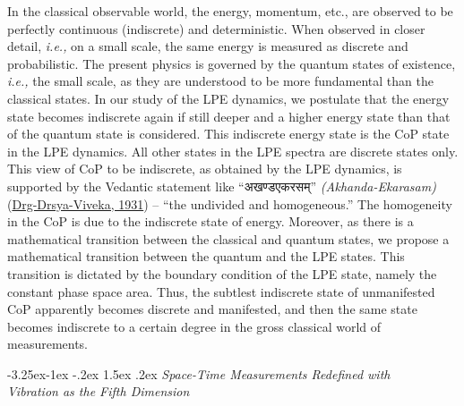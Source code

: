 \documentclass[twoside, 13pt]{article}
\makeatletter
\renewcommand\subsection{\@startsection{subsection}{2}{\z@}%
                                     {-3.25ex\@plus -1ex \@minus -.2ex}%
                                     {1.5ex \@plus .2ex}%
                                     {\normalfont\Large\bfseries}}
\makeatother
\begin{document}
{{\fontsize{12}{14}\selectfont In the classical observable world, the energy, momentum, etc., are observed to be perfectly continuous (indiscrete) and deterministic. When observed in closer detail, {\it i.e.,} on a small scale, the same energy is measured as discrete and probabilistic. The present physics is governed by the quantum states of existence, {\it i.e.,} the small scale, as they are understood to be more fundamental than the classical states. In our study of the LPE dynamics, we postulate that the energy state becomes indiscrete again if still deeper and a higher energy state than that of the quantum state is considered. This indiscrete energy state is the CoP state in the LPE dynamics. All other states in the LPE spectra are discrete states only. This view of CoP to be indiscrete, as obtained by the LPE dynamics, is supported by the Vedantic statement like \foreignlanguage{hindi}{{\fontsize{9}{11}\selectfont “अखण्डएकरसम्”}} \textit{(Akhanda-Ekarasam)} (\underline{Drg-Drsya-Viveka, 1931}) – “the undivided and homogeneous.” The homogeneity in the CoP is due to the indiscrete state of energy. Moreover, as there is a mathematical transition between the classical and quantum states, we propose a mathematical transition between the quantum and the LPE states. This transition is dictated by the boundary condition of the LPE state, namely the constant phase space area. Thus, the subtlest indiscrete state of unmanifested CoP apparently becomes discrete and manifested, and then the same state becomes indiscrete to a certain degree in the gross classical world of measurements.}

{\fontsize{8}{10}\selectfont\subsection{\textit{Space-Time Measurements Redefined with\\ Vibration as the Fifth Dimension}}}\label{subsec-3.4}

\vspace{.1cm}

}
\end{document}
